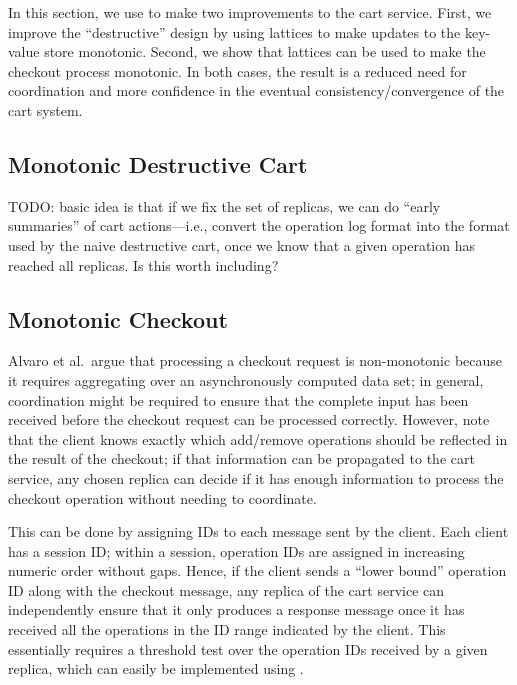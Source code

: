 In this section, we use \lang to make two improvements to the cart
service. First, we improve the ``destructive'' design by using lattices to make
updates to the key-value store monotonic. Second, we show that lattices can be
used to make the checkout process monotonic. In both cases, the result is a
reduced need for coordination and more confidence in the eventual
consistency/convergence of the cart system.

\subsection{Monotonic Destructive Cart}
TODO: basic idea is that if we fix the set of replicas, we can do ``early
summaries'' of cart actions---i.e., convert the operation log format into the
format used by the naive destructive cart, once we know that a given operation
has reached all replicas. Is this worth including?

\subsection{Monotonic Checkout}
Alvaro et al.\ argue that processing a checkout request is non-monotonic because
it requires aggregating over an asynchronously computed data set; in general,
coordination might be required to ensure that the complete input has been
received before the checkout request can be processed correctly. However, note
that the client knows exactly which add/remove operations should be reflected in
the result of the checkout; if that information can be propagated to the cart
service, any chosen replica can decide if it has enough information to process
the checkout operation without needing to coordinate.

This can be done by assigning IDs to each message sent by the client. Each
client has a session ID; within a session, operation IDs are assigned in
increasing numeric order without gaps. Hence, if the client sends a ``lower
bound'' operation ID along with the checkout message, any replica of the cart
service can independently ensure that it only produces a response message once
it has received all the operations in the ID range indicated by the client. This
essentially requires a threshold test over the operation IDs received by a given
replica, which can easily be implemented using \lang.


